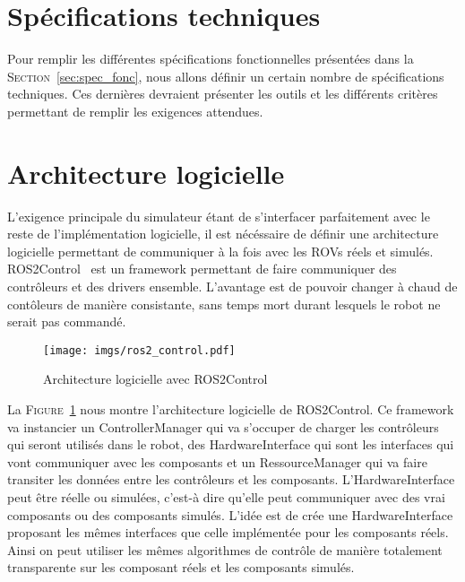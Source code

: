     \section{Spécifications techniques}

        Pour remplir les différentes spécifications fonctionnelles présentées dans la \textsc{Section}~\ref{sec:spec_fonc}, nous allons définir un certain nombre de spécifications techniques. Ces dernières devraient présenter les outils et les différents critères permettant de remplir les exigences attendues.

    \section{Architecture logicielle}

        L'exigence principale du simulateur étant de s'interfacer parfaitement avec le reste de l'implémentation logicielle, il est nécéssaire de définir une architecture logicielle permettant de communiquer à la fois avec les \gls{ROV}s réels et simulés. \gls{ROS2Control}~\cite{ros_control} est un framework permettant de faire communiquer des contrôleurs et des drivers ensemble. L'avantage est de pouvoir changer à chaud de contôleurs de manière consistante, sans temps mort durant lesquels le robot ne serait pas commandé.

        \begin{figure}[!htb]
            \centering
            \texttt{[image: imgs/ros2\_control.pdf]}
            \caption{Architecture logicielle avec \gls{ROS2Control}}
            \label{fig:ros2_control}
        \end{figure}

        La \textsc{Figure}~\ref{fig:ros2_control} nous montre l'architecture logicielle de \gls{ROS2Control}. Ce framework va instancier un \gls{ControllerManager} qui va s'occuper de charger les contrôleurs qui seront utilisés dans le robot, des \gls{HardwareInterface} qui sont les interfaces qui vont communiquer avec les composants et un \gls{RessourceManager} qui va faire transiter les données entre les contrôleurs et les composants. L'\gls{HardwareInterface} peut être réelle ou simulées, c'est-à dire qu'elle peut communiquer avec des vrai composants ou des composants simulés. L'idée est de crée une \gls{HardwareInterface} proposant les mêmes interfaces que celle implémentée pour les composants réels. Ainsi on peut utiliser les mêmes algorithmes de contrôle de manière totalement transparente sur les composant réels et les composants simulés.
